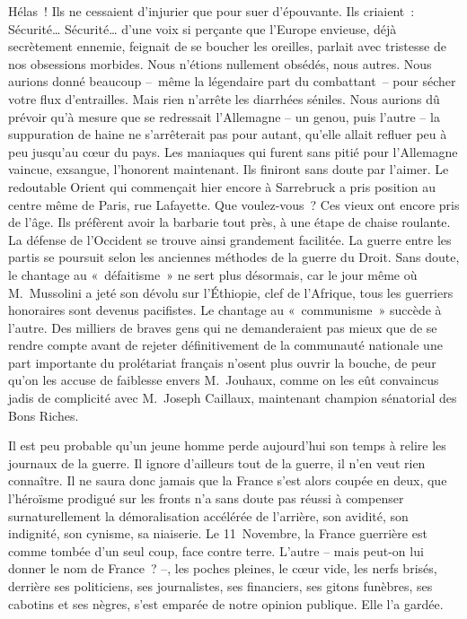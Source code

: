 \documentclass[french,twoside]{book} %
\begin{document}
Hélas ! Ils ne cessaient d’injurier que pour suer d’épouvante. Ils criaient : Sécurité… Sécurité… d’une voix si perçante que l’Europe envieuse, déjà secrètement ennemie, feignait de se boucher les oreilles, parlait avec tristesse de nos obsessions morbides. Nous n’étions nullement obsédés, nous autres. Nous aurions donné beaucoup – même la légendaire part du combattant – pour sécher votre flux d’entrailles. Mais rien n’arrête les diarrhées séniles. Nous aurions dû prévoir qu’à mesure que se redressait l’Allemagne – un genou, puis l’autre – la suppuration de haine ne s’arrêterait pas pour autant, qu’elle allait refluer peu à peu jusqu’au cœur du pays. Les maniaques qui furent sans pitié pour l’Allemagne vaincue, exsangue, l’honorent maintenant. Ils finiront sans doute par l’aimer. Le redoutable Orient qui commençait hier encore à Sarrebruck a pris position au centre même de Paris, rue Lafayette. Que voulez-vous ? Ces vieux ont encore pris de l’âge. Ils préfèrent avoir la barbarie tout près, à une étape de chaise roulante. La défense de l’Occident se trouve ainsi grandement facilitée. La guerre entre les partis se poursuit selon les anciennes méthodes de la guerre du Droit. Sans doute, le chantage au « défaitisme » ne sert plus désormais, car le jour même où M. Mussolini a jeté son dévolu sur l’Éthiopie, clef de l’Afrique, tous les guerriers honoraires sont devenus pacifistes. Le chantage au « communisme » succède à l’autre. Des milliers de braves gens qui ne demanderaient pas mieux que de se rendre compte avant de rejeter définitivement de la communauté nationale une part importante du prolétariat français n’osent plus ouvrir la bouche, de peur qu’on les accuse de faiblesse envers M. Jouhaux, comme on les eût convaincus jadis de complicité avec M. Joseph Caillaux, maintenant champion sénatorial des Bons Riches.\par
Il est peu probable qu’un jeune homme perde aujourd’hui son temps à relire les journaux de la guerre. Il ignore d’ailleurs tout de la guerre, il n’en veut rien connaître. Il ne saura donc jamais que la France s’est alors coupée en deux, que l’héroïsme prodigué sur les fronts n’a sans doute pas réussi à compenser surnaturellement la démoralisation accélérée de l’arrière, son avidité, son indignité, son cynisme, sa niaiserie. Le 11 Novembre, la France guerrière est comme tombée d’un seul coup, face contre terre. L’autre – mais peut-on lui donner le nom de France ? –, les poches pleines, le cœur vide, les nerfs brisés, derrière ses politiciens, ses journalistes, ses financiers, ses gitons funèbres, ses cabotins et ses nègres, s’est emparée de notre opinion publique. Elle l’a gardée.\par
 \par
\end{document}
